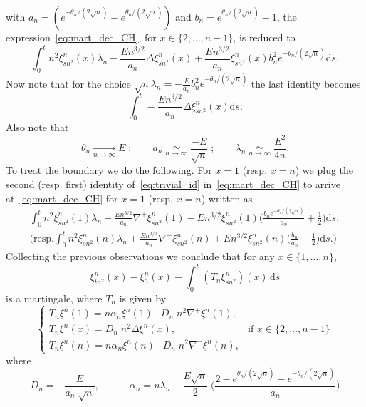 \documentclass[AHL,Unicode,longabstracts]{cedram}
\newcommand*{\dd}{\mathrm{d}}
\newcommand*{\ds}{\dd s}
\begin{document}
with $a_n=(e^{-\theta_n/(2\sqrt n)}-e^{\theta_n/(2\sqrt n)})$ and ${b_n=e^{\theta_n/(2\sqrt n)}-1}$, the expression~\eqref{eq:mart_dec_CH}, for $x\in\{2,\dots, n-1\}$, is reduced to
\begin{equation*}
\int_0^t n^2\xi_{{sn^2}}^n(x) \lambda_n- \frac{En^{3/2}}{a_n}\Delta \xi_{{sn^2}}^n(x)+\frac{En^{3/2}}{a_n}\xi_{{sn^2}}^n(x){b_n^2 e^{-\theta_n/(2\sqrt n)}}\ds.
\end{equation*}
Now note that for the choice $\sqrt n \lambda_n=-\frac{E}{a_n}{b_n^2 e^{-\theta_n/(2\sqrt n)}}$ the last identity becomes
\begin{equation*}
\int_0^t -\frac{En^{3/2}}{a_n}\Delta \xi_{{sn^2}}^n(x) \ds.
\end{equation*}
Also note that
\begin{equation}\label{eq:solution}
\theta_n \xrightarrow[n\to\infty]{} E\; ; \quad \quad a_n \underset{n\to\infty}{\simeq} \frac{-E}{\sqrt n}\; ; \quad \quad {\lambda_n\underset{n\to\infty}{\simeq}\frac{E^2}{4n}}.
\end{equation}
To treat the boundary we do the following. For $x=1$ (resp. $x=n$) we plug the second (resp. first) identity of~\eqref{eq:trivial_id} in~\eqref{eq:mart_dec_CH} to arrive at~\eqref{eq:mart_dec_CH} for $x=1$ (resp. $x=n$) written as
\begin{multline}\label{eq:mart_dec_CH_boundary}
\int_0^t n^2\xi_{{sn^2}}^n(1) \lambda_n-\frac{En^{3/2}}{a_n}\nabla^+\xi_{{sn^2}}^n(1)-En^{3/2}\xi_{{sn^2}}^n(1)\bigg(\frac{{b_ne^{-\theta_n/(2\sqrt n)}}}{a_n}+\frac{1}{2}\bigg)\ds, \\
\bigg(\text{resp.} \int_0^t n^2\xi_{{sn^2}}^n({n}) \lambda_n+\frac{En^{3/2}}{a_n}\nabla^-\xi_{sn^2}^n(n)+En^{3/2}\xi_{{sn^2}}^n(n)\bigg(\frac{{b_n}}{a_n}+\frac{1}{2}\bigg) \ds.\bigg)
\end{multline}
Collecting the previous observations we conclude that for any $x\in\{1,\dots,n\}$,
\[
\xi_{{tn^2}}^n(x)-\xi_0^n(x) - \int_0^t (T_n\xi_{{sn^2}}^n)(x) \,\ds
\]
is a martingale, where $T_n$ is given by
\begin{equation}\label{eq:omega}
\begin{cases}
T_n\xi^n(1) =n\alpha_n\xi^n(1){+D_n\; n^2}\nabla^+ \xi^n(1), \\
T_n\xi^n(x) ={D_n\; n^2} \Delta \xi^n(x), &\text{if } x \in\{2,\dots,n-1\} \\
T_n\xi^n(n) = n{\alpha_n} \xi^n(n) {-D_n\; n^2} \nabla^-\xi^n(n),
\end{cases}
\end{equation}
where
\[
D_n = - \frac{E}{a_n \; \sqrt n}, \quad \qquad \alpha_n=n\lambda_n-{\frac{E\sqrt n}{2}\;\bigg(\frac{2-e^{\theta_n/(2\sqrt n)} - e^{-\theta_n/(2\sqrt n)}}{a_n}\bigg)}
\]
\end{document}
